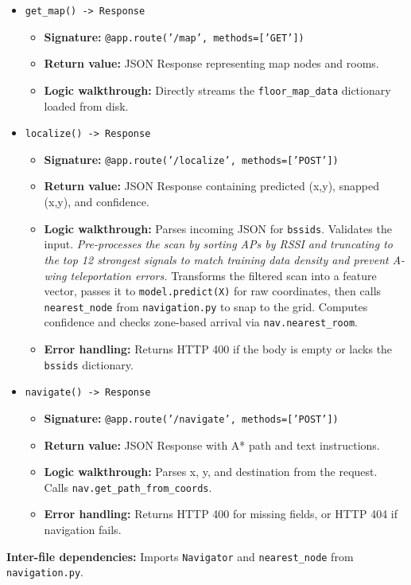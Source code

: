 \documentclass[11pt,a4paper]{article}
\begin{document}
\begin{itemize}
\begin{itemize}
\end{itemize}
\item \texttt{get\_map() -> Response}
\begin{itemize}
\item \textbf{Signature:} \texttt{@app.route('/map', methods=['GET'])}
\item \textbf{Return value:} JSON Response representing map nodes and rooms.
\item \textbf{Logic walkthrough:} Directly streams the \texttt{floor\_map\_data} dictionary loaded from disk.
\end{itemize}
\item \texttt{localize() -> Response}
\begin{itemize}
\item \textbf{Signature:} \texttt{@app.route('/localize', methods=['POST'])}
\item \textbf{Return value:} JSON Response containing predicted (x,y), snapped (x,y), and confidence.
\item \textbf{Logic walkthrough:} Parses incoming JSON for \texttt{bssids}. Validates the input. \textit{Pre-processes the scan by sorting APs by RSSI and truncating to the top 12 strongest signals to match training data density and prevent A-wing teleportation errors.} Transforms the filtered scan into a feature vector, passes it to \texttt{model.predict(X)} for raw coordinates, then calls \texttt{nearest\_node} from \texttt{navigation.py} to snap to the grid. Computes confidence and checks zone-based arrival via \texttt{nav.nearest\_room}.
\item \textbf{Error handling:} Returns HTTP 400 if the body is empty or lacks the \texttt{bssids} dictionary.
\end{itemize}
\item \texttt{navigate() -> Response}
\begin{itemize}
\item \textbf{Signature:} \texttt{@app.route('/navigate', methods=['POST'])}
\item \textbf{Return value:} JSON Response with A* path and text instructions.
\item \textbf{Logic walkthrough:} Parses x, y, and destination from the request. \\ Calls \texttt{nav.get\_path\_from\_coords}.
\item \textbf{Error handling:} Returns HTTP 400 for missing fields, or HTTP 404 if navigation fails.
\end{itemize}
\end{itemize}
\textbf{Inter-file dependencies:} Imports \texttt{Navigator} and \texttt{nearest\_node} from \texttt{navigation.py}.
\end{document}
